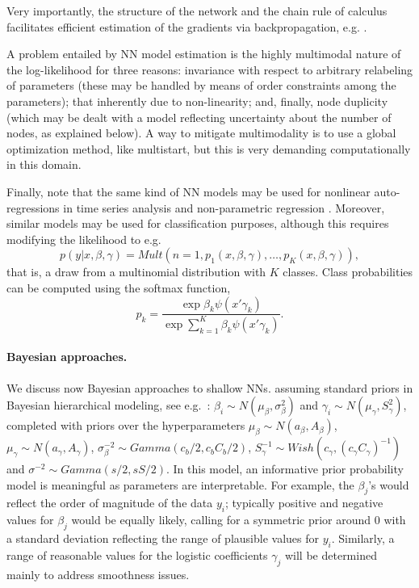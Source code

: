 \noindent    Very importantly,  the structure of the network and the 
    chain rule of calculus %
    facilitates efficient estimation of the gradients 
    via backpropagation, e.g. \parencite{rumelhart1986learning}.
    
    A problem entailed by NN model estimation is the highly multimodal nature of
    the log-likelihood for three reasons:
    invariance with respect to arbitrary relabeling of
    parameters (these may
    be handled by means of order 
    constraints among the 
    parameters);
    that inherently due to non-linearity; and, finally, 
    node duplicity (which may be dealt 
    with a model reflecting uncertainty 
    about the number of nodes,
    as explained below).
A way to mitigate multimodality is to use a global optimization method, like multistart, but
this is very demanding computationally in this domain.

Finally, note that the same kind of NN models 
may be used for nonlinear auto-regressions in
time series analysis \parencite{menchero} and 
non-parametric 
regression \parencite{insuamuller}. Moreover,
similar models may be used for classification purposes,
although this 
 requires modifying the likelihood
\parencite{bishop} to e.g.\
\begin{equation}
    p(y | x, \beta, \gamma) = Mult(n=1, 
    p_1 (x, \beta, \gamma) , \ldots, p_K (x, \beta, \gamma) ),
\end{equation}
that is, a draw from a multinomial distribution with $K$ classes. 
Class probabilities
 can be computed using the softmax function,
$$
p_k = \frac{\exp{\beta_k \psi(x'\gamma_k)}}{\exp{\sum_{k=1}^K \beta_k \psi(x'\gamma_k)}}.
$$


\paragraph{Bayesian approaches.}\label{bayeshallow}
We discuss now Bayesian approaches to shallow NNs.
assuming standard priors 
in Bayesian hierarchical modeling, see e.g.\ \parencite{LavineWest}: 
$  \beta_i      \sim  N(\mu_\beta,\sigma_\beta^2)$
and 
  $\gamma_i     \sim  N(\mu_\gamma,S_\gamma^2)$,
  completed with priors over the hyperparameters
$\mu_\beta \sim N(a_\beta,A_\beta)$,
$\mu_\gamma \sim N(a_\gamma,A_\gamma)$,
$\sigma^{-2}_\beta \sim Gamma(c_b/2,c_bC_b/2)$,
$S_\gamma^{-1} \sim Wish(c_\gamma,(c_\gamma C_\gamma)^{-1})$ and
$\sigma^{-2} \sim Gamma(s/2, sS/2)$.
In this model, 
an informative prior probability model
is meaningful as parameters are interpretable. For example, the $\beta_ j$’s would reflect the
order of magnitude of the data $y_i$; typically positive and negative values for
$\beta _j$ would be equally likely, calling for a symmetric prior around 
0 with
a standard deviation reflecting the range of plausible values for $y_i$. Similarly,
a range of reasonable values for the logistic coefficients $\gamma_ j$ will be determined
mainly to address smoothness
issues.

